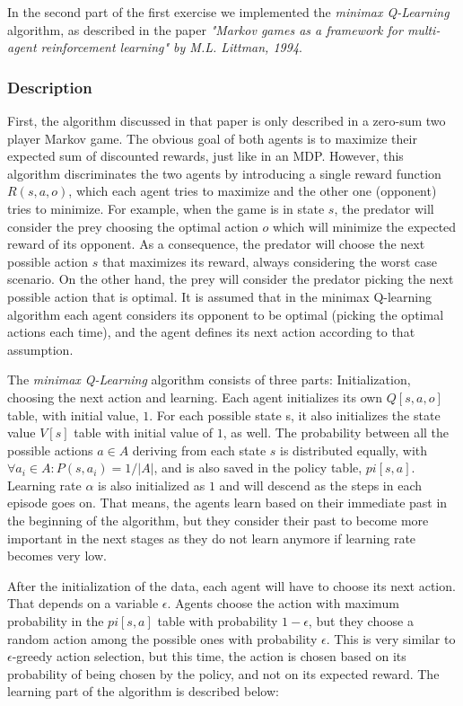 \documentclass[a4paper,11pt]{article}
\begin{document}
In the second part of the first exercise we implemented the \textit{minimax Q-Learning} algorithm, as described in the paper \textit{"Markov games as a framework for multi-agent reinforcement learning" by M.L. Littman, 1994}.

\subsubsection{Description}
First, the algorithm discussed in that paper is only described in a zero-sum two player Markov game. The obvious goal of both agents is to maximize their expected sum of discounted rewards, just like in an MDP. However, this algorithm discriminates the two agents by introducing a single reward function $R(s,a,o)$, which each agent tries to maximize and the other one (opponent) tries to minimize. For example, when the game is in state $s$, the predator will consider the prey choosing the optimal action $o$ which will minimize the expected reward of its opponent. As a consequence, the predator will choose the next possible action $s$ that maximizes its reward, always considering the worst case scenario. On the other hand, the prey will consider the predator picking the next possible action that is optimal. It is assumed that in the minimax Q-learning algorithm each agent considers its opponent to be optimal (picking the optimal actions each time), and the agent defines its next action according to that assumption.

The \textit{minimax Q-Learning} algorithm consists of three parts: 	Initialization, choosing the next action and learning. Each agent initializes its own $Q[s,a,o]$ table, with initial value, $1$. For each possible state s, it also initializes the state value $V[s]$ table with initial value of $1$, as well. The probability between all the possible actions $a \in A$ deriving from each state $s$ is distributed equally, with $\forall a_i \in A : P(s,a_{i}) = 1/|A|$, and is also saved in the policy table, $pi[s,a]$. Learning rate $\alpha$ is also initialized as $1$ and will descend as the steps in each episode goes on. That means, the agents learn based on their immediate past in the beginning of the algorithm, but they consider their past to become more important in the next stages as they do not learn anymore if learning rate becomes very low.

After the initialization of the data, each agent will have to choose its next action. That depends on a variable $\epsilon$.  Agents choose the action with maximum probability in the $pi[s,a]$ table with probability $1-\epsilon$, but they choose a random action among the possible ones with probability $\epsilon$. This is very similar to $\epsilon$-greedy action selection, but this time, the action is chosen based on its probability of being chosen by the policy, and not on its expected reward. The learning part of the algorithm is described below:
\end{document}
